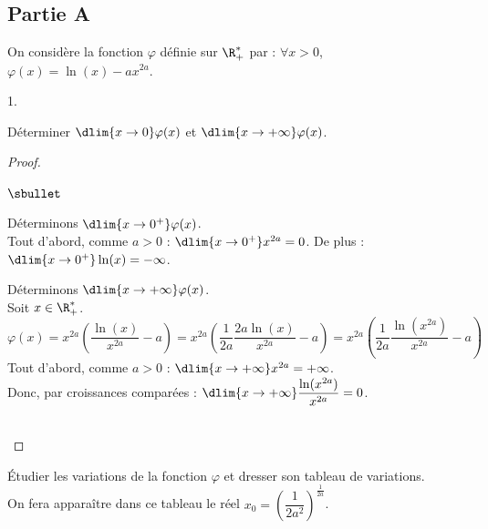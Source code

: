 \subsection*{Partie A}
\noindent
On considère la fonction $\varphi$ définie sur $\R_+^*$ par : $\forall 
x>0$, $\varphi(x)=\ln(x)-ax^{2a}$.
\begin{noliste}{1.}
\item Déterminer $\dlim{x\to 0} \varphi(x)$ et $\dlim{x\to+\infty}
  \varphi(x)$.

  \begin{proof}~
    \begin{noliste}{$\sbullet$}
    \item Déterminons $\dlim{x\to 0^+} \varphi(x)$.\\[.2cm]
      Tout d'abord, comme $a>0$ : $\dlim{x\to 0^+} x^{2a}=0$. De 
      plus : $\dlim{x\to 0^+}\ln(x)=-\infty$.
    \item Déterminons $\dlim{x\to+\infty} \varphi(x)$.\\[.2cm]
      Soit $x\in\R_+^*$. 
      \[
      \varphi(x)=x^{2a}\left(\dfrac{\ln(x)}{x^{2a}}-a\right) = x^{2a} \left(
        \dfrac{1}{2a} \dfrac{2a\ln(x)}{x^{2a}} -a\right)=x^{2a} \left(
        \dfrac{1}{2a}\dfrac{\ln(x^{2a})}{x^{2a}}-a\right)
      \]
      Tout d'abord, comme $a>0$ : $\dlim{x\to+\infty} x^{2a}=+\infty$.\\
      Donc, par croissances comparées : 
      $\dlim{x\to+\infty}\dfrac{\ln(x^{2a})}{x^{2a}}=0$.\\[.2cm]
      ~\\[-1.4cm]
    \end{noliste}
  \end{proof}
  
\item Étudier les variations de la fonction $\varphi$ et dresser son
  tableau de variations.\\
  On fera apparaître dans ce tableau le réel $x_0 =
  \left(\dfrac{1}{2a^2}\right)^{\frac{1}{2a}}$.


\end{noliste}
